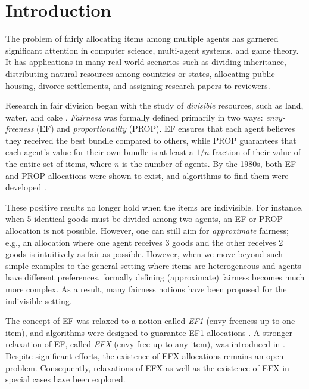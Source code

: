 \section{Introduction}
\label{sec:intro}

The problem of fairly allocating items among multiple agents has garnered significant attention
in computer science, multi-agent systems, and game theory.
It has applications in many real-world scenarios such as dividing inheritance,
distributing natural resources among countries or states, allocating public housing,
divorce settlements, and assigning research papers to reviewers.

Research in fair division began with the study of \emph{divisible} resources, such as land, water, and cake
\citep{steinhaus1940sur,stromquist1980how,varian1974equity}.
\emph{Fairness} was formally defined primarily in two ways:
\emph{envy-freeness} (EF) and \emph{proportionality} (PROP).
EF ensures that each agent believes they received the best bundle compared to others,
while PROP guarantees that each agent's value for their own bundle is at least
a $1/n$ fraction of their value of the entire set of items, where $n$ is the number of agents.
By the 1980s, both EF and PROP allocations were shown to exist,
and algorithms to find them were developed
\citep{steinhaus1940sur,stromquist1980how,varian1974equity}.

These positive results no longer hold when the items are indivisible.
For instance, when 5 identical goods must be divided among two agents, an EF or PROP allocation is not possible.
However, one can still aim for \emph{approximate} fairness; e.g.,
an allocation where one agent receives 3 goods and the other receives 2 goods is intuitively as fair as possible.
However, when we move beyond such simple examples to the general setting where
items are heterogeneous and agents have different preferences,
formally defining (approximate) fairness becomes much more complex.
As a result, many fairness notions have been proposed for the indivisible setting.

The concept of EF was relaxed to a notion called \emph{EF1}\fairDefLater{} (envy-freeness up to one item),
and algorithms were designed to guarantee EF1 allocations \citep{budish2011combinatorial,lipton2004approximately}.
A stronger relaxation of EF, called \emph{EFX}\fairDefAgain{} (envy-free up to any item),
was introduced in \citet{caragiannis2019unreasonable}.
Despite significant efforts, the existence of EFX allocations remains an open problem.
Consequently, relaxations of EFX \citep{caragiannis2023new,amanatidis2020multiple,chaudhury2021little}
as well as the existence of EFX in special cases \citep{chaudhury2024efx,plaut2020almost,amanatidis2021maximum}
have been explored.

